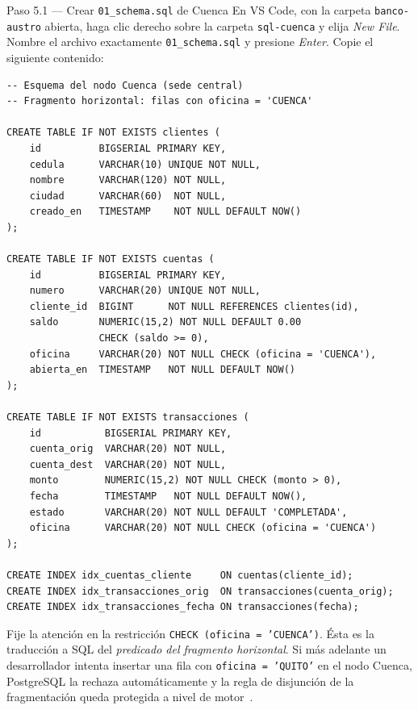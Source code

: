 \documentclass[11pt,a4paper]{article}
\begin{document}
\begin{pasobox}{Paso 5.1 --- Crear \texttt{01\_schema.sql} de Cuenca}
En VS Code, con la carpeta \texttt{banco-austro} abierta, haga clic derecho sobre la carpeta \texttt{sql-cuenca} y elija \emph{New File}. Nombre el archivo exactamente \texttt{01\_schema.sql} y presione \emph{Enter}. Copie el siguiente contenido:

\begin{lstlisting}[style=sqlstyle,caption={sql-cuenca/01\_schema.sql}]
-- Esquema del nodo Cuenca (sede central)
-- Fragmento horizontal: filas con oficina = 'CUENCA'

CREATE TABLE IF NOT EXISTS clientes (
    id          BIGSERIAL PRIMARY KEY,
    cedula      VARCHAR(10) UNIQUE NOT NULL,
    nombre      VARCHAR(120) NOT NULL,
    ciudad      VARCHAR(60)  NOT NULL,
    creado_en   TIMESTAMP    NOT NULL DEFAULT NOW()
);

CREATE TABLE IF NOT EXISTS cuentas (
    id          BIGSERIAL PRIMARY KEY,
    numero      VARCHAR(20) UNIQUE NOT NULL,
    cliente_id  BIGINT      NOT NULL REFERENCES clientes(id),
    saldo       NUMERIC(15,2) NOT NULL DEFAULT 0.00
                CHECK (saldo >= 0),
    oficina     VARCHAR(20) NOT NULL CHECK (oficina = 'CUENCA'),
    abierta_en  TIMESTAMP   NOT NULL DEFAULT NOW()
);

CREATE TABLE IF NOT EXISTS transacciones (
    id           BIGSERIAL PRIMARY KEY,
    cuenta_orig  VARCHAR(20) NOT NULL,
    cuenta_dest  VARCHAR(20) NOT NULL,
    monto        NUMERIC(15,2) NOT NULL CHECK (monto > 0),
    fecha        TIMESTAMP   NOT NULL DEFAULT NOW(),
    estado       VARCHAR(20) NOT NULL DEFAULT 'COMPLETADA',
    oficina      VARCHAR(20) NOT NULL CHECK (oficina = 'CUENCA')
);

CREATE INDEX idx_cuentas_cliente     ON cuentas(cliente_id);
CREATE INDEX idx_transacciones_orig  ON transacciones(cuenta_orig);
CREATE INDEX idx_transacciones_fecha ON transacciones(fecha);
\end{lstlisting}
\end{pasobox}

\begin{notabox}
Fije la atenci\'on en la restricci\'on \texttt{CHECK (oficina = 'CUENCA')}. \'Esta es la traducci\'on a SQL del \emph{predicado del fragmento horizontal}. Si m\'as adelante un desarrollador intenta insertar una fila con \texttt{oficina = 'QUITO'} en el nodo Cuenca, PostgreSQL la rechaza autom\'aticamente y la regla de disjunci\'on de la fragmentaci\'on queda protegida a nivel de motor~\cite[cap.~3]{Ozsu2020Principles}.
\end{notabox}
\end{document}
